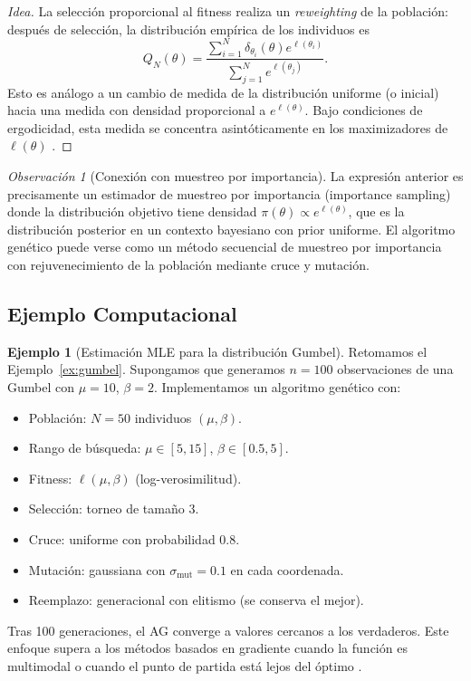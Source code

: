 \documentclass[11pt,a4paper]{article}
\theoremstyle{plain}
\theoremstyle{definition}
\newtheorem{example}[theorem]{Ejemplo}
\theoremstyle{remark}
\newtheorem{remark}[theorem]{Observación}
\newcommand{\1}{\mathbf{1}}
\begin{document}
\begin{proof}[Idea]
La selección proporcional al fitness realiza un \emph{reweighting} de la población: después de selección, la distribución empírica de los individuos es
\[
Q_N(\theta) = \frac{\sum_{i=1}^N \delta_{\theta_i}(\theta) e^{\ell(\theta_i)}}{\sum_{j=1}^N e^{\ell(\theta_j)}}.
\]
Esto es análogo a un cambio de medida de la distribución uniforme (o inicial) hacia una medida con densidad proporcional a $e^{\ell(\theta)}$. Bajo condiciones de ergodicidad, esta medida se concentra asintóticamente en los maximizadores de $\ell(\theta)$ \cite{celeux1985algorithme}.
\end{proof}

\begin{remark}[Conexión con muestreo por importancia]
La expresión anterior es precisamente un estimador de muestreo por importancia (importance sampling) donde la distribución objetivo tiene densidad $\pi(\theta) \propto e^{\ell(\theta)}$, que es la distribución posterior en un contexto bayesiano con prior uniforme. El algoritmo genético puede verse como un método secuencial de muestreo por importancia con rejuvenecimiento de la población mediante cruce y mutación.
\end{remark}

\subsection{Ejemplo Computacional}

\begin{example}[Estimación MLE para la distribución Gumbel]
Retomamos el Ejemplo~\ref{ex:gumbel}. Supongamos que generamos $n=100$ observaciones de una Gumbel con $\mu=10$, $\beta=2$. Implementamos un algoritmo genético con:
\begin{itemize}
\item Población: $N=50$ individuos $(\mu,\beta)$.
\item Rango de búsqueda: $\mu \in [5,15]$, $\beta \in [0.5,5]$.
\item Fitness: $\ell(\mu,\beta)$ (log-verosimilitud).
\item Selección: torneo de tamaño 3.
\item Cruce: uniforme con probabilidad 0.8.
\item Mutación: gaussiana con $\sigma_{\text{mut}} = 0.1$ en cada coordenada.
\item Reemplazo: generacional con elitismo (se conserva el mejor).
\end{itemize}

Tras 100 generaciones, el AG converge a valores cercanos a los verdaderos. Este enfoque supera a los métodos basados en gradiente cuando la función es multimodal o cuando el punto de partida está lejos del óptimo \cite{fuentes2015maximizacion}.
\end{example}
\end{document}
